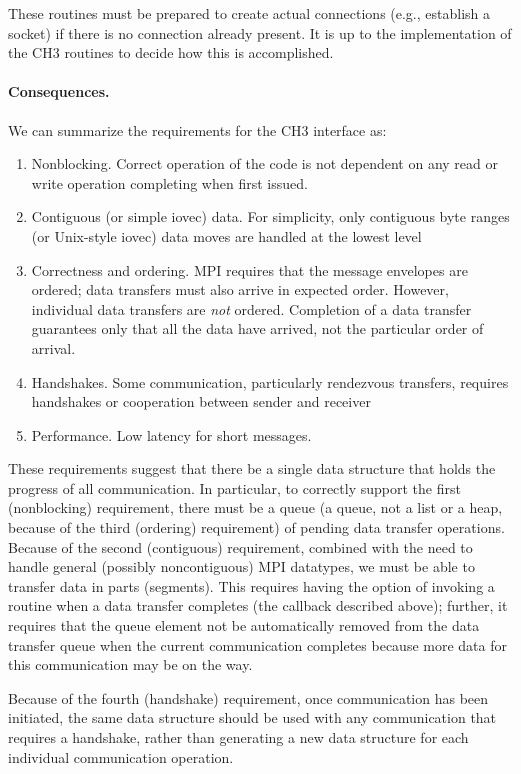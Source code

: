 \documentclass{article}
\begin{document}
These routines must be prepared to create actual connections (e.g., establish
a socket) if there is no connection already present.  It is up to the
implementation of the CH3 routines to decide how this is accomplished.

\paragraph{Consequences.}
We can summarize the requirements for the CH3 interface as:
\begin{enumerate}
\item Nonblocking.  Correct operation of the code is not dependent on any read
  or write operation completing when first issued.  
\item Contiguous (or simple iovec) data.  For simplicity, only contiguous byte
  ranges (or Unix-style iovec) data moves are handled at the lowest level
\item Correctness and ordering.  MPI requires that the message
  envelopes are ordered; data 
  transfers must also arrive in expected order.  However, individual
data transfers are \emph{not} ordered.  Completion of a data transfer
guarantees only that all the data have arrived, not the particular
order of arrival.
\item Handshakes.  Some communication, particularly rendezvous transfers,
  requires handshakes or cooperation between sender and receiver
\item Performance.  Low latency for short messages.
\end{enumerate}
These requirements suggest that there be a single data structure that holds
the progress of all communication. 
In particular, to correctly support the first (nonblocking) requirement, there
must be a queue (a queue, not a list or a heap, because of the third
(ordering) requirement) of 
pending data transfer operations.  
Because of the second (contiguous) requirement, combined with the need to
handle general (possibly noncontiguous) MPI datatypes, we must be able to
transfer data in parts (segments).  This requires having the option of
invoking a routine when a data transfer completes (the callback described
above); further, it requires that the queue element not be automatically
removed from the data transfer queue when the current communication completes
because more data for this communication may be on the way.

Because of the fourth (handshake) requirement, once communication has been
initiated, the same data structure should be used with any communication that
requires a handshake, rather than generating a new data structure for each
individual communication operation.  
\end{document}

